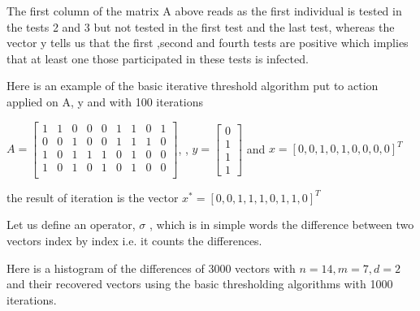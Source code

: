 The first column of the matrix A above reads as the first individual is tested in the tests 2 and 3 but not tested in the first test and the last test, whereas the vector y tells us that the first ,second and fourth tests are positive which implies that at least one those participated in these tests is infected. 



Here is an example of the basic iterative threshold algorithm put to action applied on A, y and with 100 iterations


$ A =  \begin{bmatrix}
1 & 1 & 0 & 0 & 0 & 1 & 1 & 0 &1 \\
0 & 0 & 1 & 0 & 0 & 1 & 1 & 1 &0 \\
1 & 0 & 1 & 1 & 1 & 0 & 1 & 0 &0 \\
1 & 0 & 1 & 0 & 1 & 0 & 1 & 0 &0 \\
\end{bmatrix}$,  \quad , $y = \begin{bmatrix}
0\\
1\\
1\\
1
\end{bmatrix}$
and $ x = [0, 0, 1, 0, 1, 0, 0, 0, 0]^{T} $ 


the result of iteration is the vector $ x^* = [0, 0, 1, 1, 1, 0, 1, 1, 0]^{T} $ 

Let us define an operator, $\sigma$  , which is in simple words the difference between two vectors index by index i.e. it counts the differences. 

Here is a histogram of the differences of 3000 vectors with $ n = 14, m= 7, d = 2 $ and their recovered vectors using the basic thresholding algorithms with 1000 iterations. 

